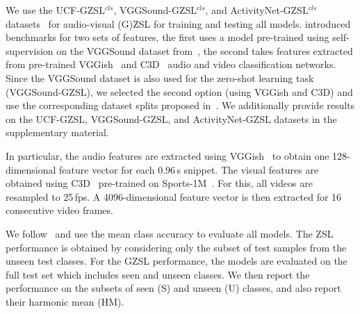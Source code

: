 \documentclass[runningheads]{llncs}
\newcommand{\mypara}[1]{\noindent{\bf{#1}}}
\newcommand{\activity}{{ActivityNet-GZSL$^{cls}$}\xspace}
\newcommand{\ucf}{{UCF-GZSL$^{cls}$}\xspace}
\newcommand{\vgg}{{VGGSound-GZSL$^{cls}$}\xspace}
\newcommand{\selaactivity}{{ActivityNet-GZSL}\xspace}
\newcommand{\selaucf}{{UCF-GZSL}\xspace}
\newcommand{\selavgg}{{VGGSound-GZSL}\xspace}
\begin{document}
\mypara{Datasets.}
We use the \ucf, \vgg, and \activity datasets~\cite{mercea2022} for audio-visual (G)ZSL for training and testing all models. \cite{mercea2022} introduced benchmarks for two sets of features, the first uses a model pre-trained using self-supervision on the VGGSound dataset from~\cite{asano2020labelling}, the second takes features extracted from pre-trained VGGish~\cite{hershey2017cnn} and C3D~\cite{tran2015learning} audio and video classification networks. Since the VGGSound dataset is also used for the zero-shot learning task (\selavgg), we selected the second option (using VGGish and C3D) and use the corresponding dataset splits proposed in~\cite{mercea2022}. We additionally provide results on the \selaucf, \selavgg, and \selaactivity datasets in the supplementary material.

In particular, the audio features are extracted using VGGish~\cite{hershey2017cnn} to obtain one 128-dimensional feature vector for each $0.96$\,s snippet. The 
visual features are obtained using C3D~\cite{tran2015learning} pre-trained on Sports-1M~\cite{KarpathyCVPR14}.
For this, all videos are resampled to 25\,fps. A 4096-dimensional feature vector is then extracted for 16 consecutive video frames.


\mypara{Evaluation metrics.}
We follow~\cite{xian2018zero,mercea2022} and use the mean class accuracy to evaluate all models. The ZSL performance is obtained by considering only the subset of test samples from the unseen test classes. For the GZSL performance, the models are evaluated on the full test set which includes seen and unseen classes. We then report the performance on the subsets of seen (S) and unseen (U) classes, and also report their harmonic mean (HM).
\end{document}
